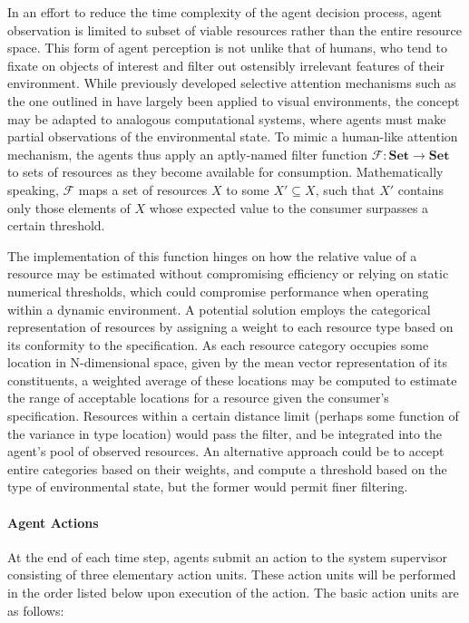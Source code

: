 \documentclass{article}
\theoremstyle{definition}
\theoremstyle{remark}
\begin{document}
			In an effort to reduce the time complexity of the agent decision process, agent observation is limited to subset of viable resources rather than the entire resource space. This form of agent perception is not unlike that of humans, who tend to fixate on objects of interest and filter out ostensibly irrelevant features of their environment. While previously developed selective attention mechanisms such as the one outlined in \cite{mnih2014recurrent} have largely been applied to visual environments, the concept may be adapted to analogous computational systems, where agents must make partial observations of the environmental state. To mimic a human-like attention mechanism, the agents thus apply an aptly-named filter function $\mathcal{F}: \mathbf{Set} \rightarrow \mathbf{Set}$ to sets of resources as they become available for consumption. Mathematically speaking, $\mathcal{F}$ maps a set of resources $X$ to some $X' \subseteq X$, such that $X'$ contains only those elements of $X$ whose expected value to the consumer surpasses a certain threshold.
			
			The implementation of this function hinges on how the relative value of a resource may be estimated without compromising efficiency or relying on static numerical thresholds, which could compromise performance when operating within a dynamic environment. A potential solution employs the categorical representation of resources by assigning a weight to each resource type based on its conformity to the specification. As each resource category occupies some location in N-dimensional space, given by the mean vector representation of its constituents, a weighted average of these locations may be computed to estimate the range of acceptable locations for a resource given the consumer's specification. Resources within a certain distance limit (perhaps some function of the variance in type location) would pass the filter, and be integrated into the agent's pool of observed resources. An alternative approach could be to accept entire categories based on their weights, and compute a threshold based on the type of environmental state, but the former would permit finer filtering.

			\paragraph{Agent Actions}

			At the end of each time step, agents submit an action to the system supervisor consisting of three elementary action units. These action units will be performed in the order listed below upon execution of the action. The basic action units are as follows:
			
\end{document}
